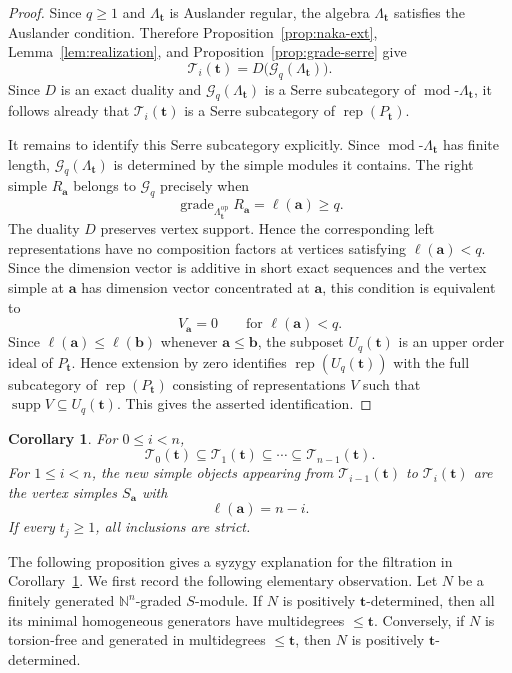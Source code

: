 \documentclass[12pt,reqno]{amsart}
\newtheorem{corollary}[theorem]{Corollary}
\theoremstyle{definition}
\theoremstyle{remark}
\newcommand{\Rep}{\operatorname{rep}}
\newcommand{\grade}{\operatorname{grade}}
\newcommand{\modcat}{\operatorname{mod}}
\begin{document}
\begin{proof}
Since $q\ge1$ and $\Lambda_{\mathbf t}$ is Auslander regular, the algebra $\Lambda_{\mathbf t}$ satisfies the Auslander condition.  Therefore Proposition~\ref{prop:naka-ext}, Lemma~\ref{lem:realization}, and Proposition~\ref{prop:grade-serre} give
\[
\mathcal T_i(\mathbf t)
=
D\bigl(\mathcal G_q(\Lambda_{\mathbf t})\bigr).
\]
Since $D$ is an exact duality and $\mathcal G_q(\Lambda_{\mathbf t})$ is a Serre subcategory of $\modcat\text{-}\Lambda_{\mathbf t}$, it follows already that $\mathcal T_i(\mathbf t)$ is a Serre subcategory of $\Rep(P_{\mathbf t})$.

It remains to identify this Serre subcategory explicitly.  Since $\modcat\text{-}\Lambda_{\mathbf t}$ has finite length, $\mathcal G_q(\Lambda_{\mathbf t})$ is determined by the simple modules it contains.  The right simple $R_{\mathbf a}$ belongs to $\mathcal G_q$ precisely when
\[
\grade_{\Lambda_{\mathbf t}^{\mathrm{op}}}R_{\mathbf a}=\ell(\mathbf a)\ge q.
\]
The duality $D$ preserves vertex support.  Hence the corresponding left representations have no composition factors at vertices satisfying $\ell(\mathbf a)<q$.  Since the dimension vector is additive in short exact sequences and the vertex simple at $\mathbf a$ has dimension vector concentrated at $\mathbf a$, this condition is equivalent to
\[
V_{\mathbf a}=0\qquad\text{for }\ell(\mathbf a)<q.
\]
Since $\ell(\mathbf a)\le\ell(\mathbf b)$ whenever
$\mathbf a\le\mathbf b$, the subposet $U_q(\mathbf t)$ is an upper order
ideal of $P_{\mathbf t}$.  Hence extension by zero identifies
$\Rep(U_q(\mathbf t))$ with the full subcategory of
$\Rep(P_{\mathbf t})$ consisting of representations $V$ such that
$\operatorname{supp}V\subseteq U_q(\mathbf t)$.  This gives the asserted
identification.
\end{proof}

\begin{corollary}\label{cor:finite-filtration}
For $0\le i<n$,
\[
\mathcal T_0(\mathbf t)
\subseteq\mathcal T_1(\mathbf t)
\subseteq\cdots\subseteq\mathcal T_{n-1}(\mathbf t).
\]
For $1\le i<n$, the new simple objects appearing from
$\mathcal T_{i-1}(\mathbf t)$ to $\mathcal T_i(\mathbf t)$ are the vertex
simples $S_{\mathbf a}$ with
\[
\ell(\mathbf a)=n-i.
\]
If every $t_j\ge1$, all inclusions are strict.
\end{corollary}

The following proposition gives a syzygy explanation for the filtration in Corollary~\ref{cor:finite-filtration}. We first record the following elementary observation. Let $N$ be a finitely generated $\mathbb N^n$-graded $S$-module. If $N$ is positively $\mathbf t$-determined, then all its minimal homogeneous generators have multidegrees $\le \mathbf t$. Conversely, if $N$ is torsion-free and generated in multidegrees $\le \mathbf t$, then $N$ is positively $\mathbf t$-determined.
\end{document}
